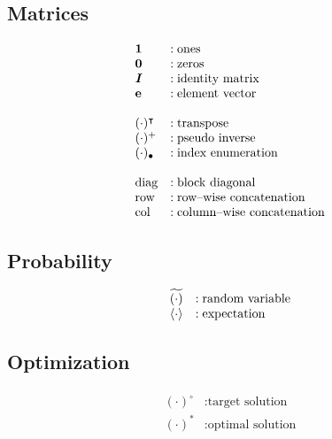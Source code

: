 \documentclass{article}
\begin{document}
\subsection{Matrices}
    \begin{align*}
        \begin{array}{ll}
            \textbf{1} &:\text{ones}\\
            \textbf{0} &:\text{zeros}\\
            \emph{\textbf{I}} &:\text{identity matrix}\\
            \textbf{e} &:\text{element vector}\\
            \\
            (\cdot)^\intercal&:\text{transpose}\\
            (\cdot)^+ &:\text{pseudo inverse}\\
            (\cdot)_\bullet &:\text{index enumeration}\\
            \\
            \text{diag}&:\text{block diagonal}\\
            \text{row}&:\text{row--wise concatenation}\\
            \text{col}&:\text{column--wise concatenation}
        \end{array}
    \end{align*}
\subsection{Probability}
    \begin{align*}
        \begin{array}{ll}
            \widetilde{(\cdot)}&:\text{random variable}\\
            \langle\cdot\rangle&:\text{expectation}
        \end{array}
    \end{align*}
\subsection{Optimization}
    \begin{align*}
        \begin{array}{ll}
            (\cdot)^\circ   &:\text{target solution}\\
            (\cdot)^*       &:\text{optimal solution}
        \end{array}
    \end{align*}
\end{document}
